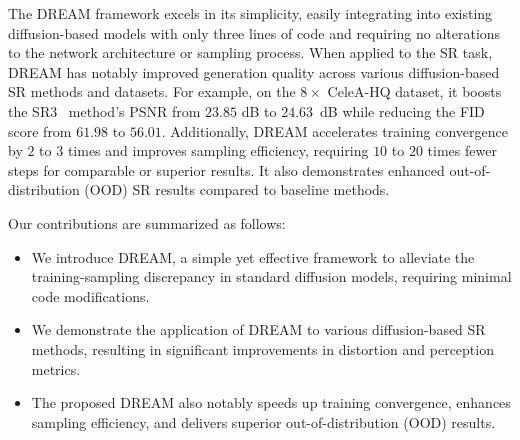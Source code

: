 \documentclass[10pt,twocolumn,letterpaper]{article}
\begin{document}
The DREAM framework excels in its simplicity, easily integrating into existing diffusion-based models with only three lines of code and requiring no alterations to the network architecture or sampling process. When applied to the SR task, DREAM has notably improved generation quality across various diffusion-based SR methods and datasets. For example, on the $8\times$ CeleA-HQ dataset, it boosts the SR3~\cite{saharia2022image} method's PSNR from $23.85$ dB to $24.63$~dB while reducing the FID score from $61.98$ to $56.01$. Additionally, DREAM accelerates training convergence by $2$ to $3$ times and improves sampling efficiency, requiring $10$ to $20$ times fewer steps for comparable or superior results. It also demonstrates enhanced out-of-distribution (OOD) SR results compared to baseline methods.

Our contributions are summarized as follows:
\begin{itemize}
    \item We introduce DREAM, a simple yet effective framework to alleviate the training-sampling discrepancy in standard diffusion models, requiring minimal code modifications.
    \item We demonstrate the application of DREAM to various diffusion-based SR methods, resulting in significant improvements in distortion and perception metrics.
    \item The proposed DREAM also notably speeds up training convergence, enhances sampling efficiency, and delivers superior out-of-distribution (OOD) results.
\end{itemize}
\end{document}
